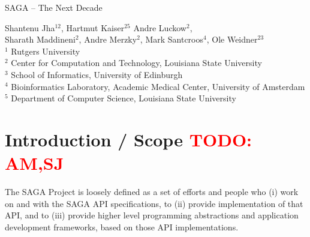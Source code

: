 \documentclass{article}
\newcommand{\B}[1]{\textbf{#1}}
\newcommand{\todo}[1]{{\textcolor{red}{\B{TODO:} #1 }}}
\begin{document}
\begin{center}
 {\Large SAGA -- The Next Decade}
\end{center}

{
 {
  \centering
  Shantenu Jha$^{12}$,
  Hartmut Kaiser$^{25}$
  Andre Luckow$^{2}$,\\
  Sharath Maddineni$^{2}$,
  Andre Merzky$^{2}$,
  Mark Santcroos$^{4}$,
  Ole Weidner$^{23}$
  \\[0.4em]
  }
 \noindent
 \tiny
 $^1$ Rutgers University\\[-1.0em]
 $^2$ Center for Computation and Technology, Louisiana State University\\[-1.0em]
 $^3$ School of Informatics, University of Edinburgh \\[-1.0em]
 $^4$ Bioinformatics Laboratory, Academic Medical Center, University of Amsterdam\\[-1.0em]
 $^5$ Department of Computer Science, Louisiana State University\\[-1.0em]
}

\begin{abstract}

  
  The SAGA Project (as described below) has grown over time and
  evolved with the ``infrastructure''. In this paper, we provide a
  retrospective -- an analysis of how where we are with respect to how
  and where would be, as well as a forward looking evolution and
  growth trajectory.  This paper is a summary of that process, and of
  our consolidation as a project.



\end{abstract}


\section{Introduction / Scope \todo{AM,SJ}}
\label{sec:intro}

 
The SAGA Project is loosely defined as a set of
efforts and people who (i) work on and with the SAGA API
specifications, to (ii) provide implementation of that API, and to
(iii) provide higher level programming abstractions and application
development frameworks, based on those API implementations.  
\end{document}
